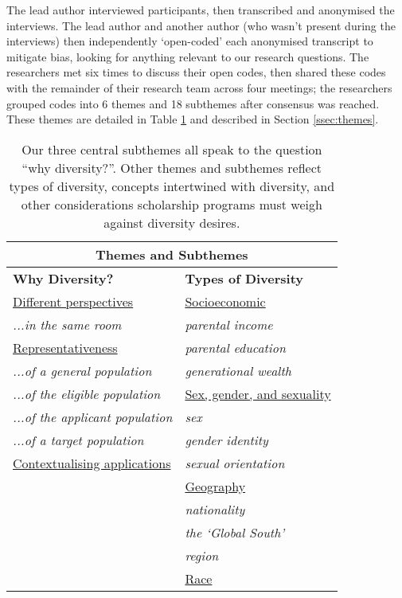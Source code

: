 The lead author interviewed participants, then transcribed and anonymised the interviews. The lead author and another author (who wasn't present during the interviews) then independently `open-coded' each anonymised transcript to mitigate bias, looking for anything relevant to our research questions. The researchers met six times to discuss their open codes, then shared these codes with the remainder of their research team across four meetings; the researchers grouped codes into 6 themes and 18 subthemes after consensus was reached. These themes are detailed in Table \ref{tab:themes} and described in Section \ref{ssec:themes}.

\begin{table}[htbp]
    \centering
    \caption{Our three central subthemes all speak to the question ``why diversity?''. Other themes and subthemes reflect types of diversity, concepts intertwined with diversity, and other considerations scholarship programs must weigh against diversity desires.}
    \label{tab:themes}
    \begin{tabular}{|p{}|p{}|}
        \hline
        \multicolumn{2}{|c|}{\textbf{Themes and Subthemes}} \\
        \hline
        \textbf{Why Diversity?} & \textbf{Types of Diversity} \\
        \underline{Different perspectives} & \underline{Socioeconomic} \\
        \emph{...in the same room} & \emph{parental income} \\
        \underline{Representativeness} & \emph{parental education} \\
        \emph{...of a general population} & \emph{generational wealth} \\
        \emph{...of the eligible population} & \underline{Sex, gender, and sexuality} \\
        \emph{...of the applicant population} & \emph{sex} \\
        \emph{...of a target population} & \emph{gender identity} \\
        \underline{Contextualising applications} & \emph{sexual orientation} \\
         & \underline{Geography} \\
         & \emph{nationality} \\
         & \emph{the `Global South'} \\
         & \emph{region} \\
         & \underline{Race} \\

\end{tabular}
\end{table}
